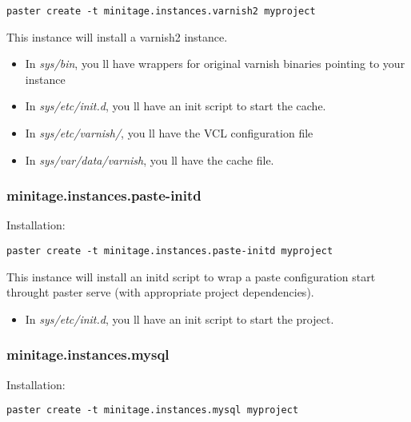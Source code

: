 \documentclass[letterpaper,10pt,english]{sphinxmanual}
\begin{document}
\begin{Verbatim}[commandchars=@\[\]]
paster create -t minitage.instances.varnish2 myproject
\end{Verbatim}

This instance will install a varnish2 instance.
\begin{itemize}
\item {} 
In \emph{sys/bin}, you ll have wrappers for original varnish binaries pointing to your instance

\item {} 
In \emph{sys/etc/init.d}, you ll have an init script to start the cache.

\item {} 
In \emph{sys/etc/varnish/}, you ll have the VCL configuration file

\item {} 
In \emph{sys/var/data/varnish}, you ll have the cache file.

\end{itemize}


\subsubsection{minitage.instances.paste-initd}
\label{paster/instances/instances:minitage-instances-paste-initd}
Installation:

\begin{Verbatim}[commandchars=@\[\]]
paster create -t minitage.instances.paste-initd myproject
\end{Verbatim}

This instance will install an initd script to wrap a paste configuration start throught paster serve (with appropriate project dependencies).
\begin{itemize}
\item {} 
In \emph{sys/etc/init.d}, you ll have an init script to start the project.

\end{itemize}


\subsubsection{minitage.instances.mysql}
\label{paster/instances/instances:minitage-instances-mysql}
Installation:

\begin{Verbatim}[commandchars=@\[\]]
paster create -t minitage.instances.mysql myproject
\end{Verbatim}
\end{document}
